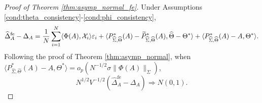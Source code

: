 \documentclass[authoryear,preprint,review,12pt]{elsarticle}
\begin{document}
\begin{proof}[Proof of Theorem \ref{thm:asymp_normal_fe}]
	Under Assumptions \ref{cond:theta_consistency}-\ref{cond:phi_consistency}, 
	\[
	\widehat{\Delta}_A^{\mathrm{fe}} - {\Delta}_A  =  \frac{1}{N} \sum_{i=1}^N \langle{\Phi}(A), \mathcal{X}_i \rangle \varepsilon_i +  \langle   P_{\widehat{\Sigma},\widehat{\Theta}}^\ast(A) - \widetilde P_{\widehat{\Sigma},\widehat{\Theta}}^\ast(A) , \widehat\Theta - \Theta^\ast\rangle + \langle P_{\widehat\Sigma, \widehat\Theta }^\ast(A) -  A, \Theta^\ast \rangle.
	\]
	Following the proof of Theorem \ref{thm:asymp_normal},  when $\langle P_{\widehat\Sigma, \widehat\Theta }^\ast(A) -  A, \Theta^\ast \rangle = o_p(N^{-1/2}\sigma\|\Phi(A)\|_{\Sigma})$, 
	\[ N^{1/2} V^{-1/2} (\widehat{\Delta}_A^{\mathrm{fe}} - {\Delta}_A) \Rightarrow N(0,1).\]
\end{proof}
\end{document}
